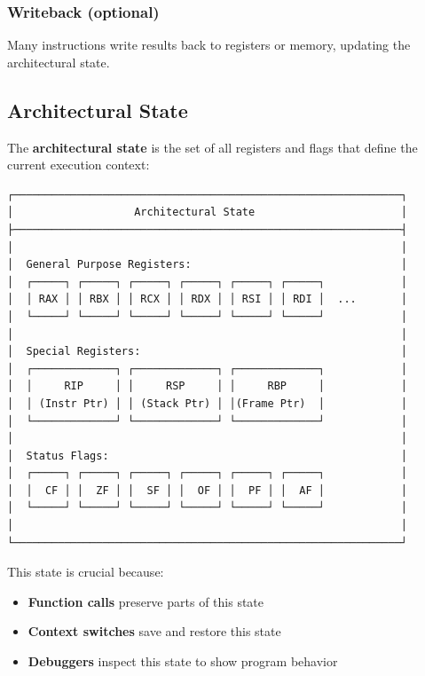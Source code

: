\subsubsection{Writeback (optional)}
Many instructions write results back to registers or memory, updating the architectural state.

\subsection{Architectural State}

The \textbf{architectural state} is the set of all registers and flags that define the current execution context:

\begin{verbatim}
┌─────────────────────────────────────────────────────────────┐
│                   Architectural State                       │
├─────────────────────────────────────────────────────────────┤
│                                                             │
│  General Purpose Registers:                                 │
│  ┌─────┐ ┌─────┐ ┌─────┐ ┌─────┐ ┌─────┐ ┌─────┐            │
│  │ RAX │ │ RBX │ │ RCX │ │ RDX │ │ RSI │ │ RDI │  ...       │
│  └─────┘ └─────┘ └─────┘ └─────┘ └─────┘ └─────┘            │
│                                                             │
│  Special Registers:                                         │
│  ┌─────────────┐ ┌─────────────┐ ┌─────────────┐            │
│  │     RIP     │ │     RSP     │ │     RBP     │            │
│  │ (Instr Ptr) │ │ (Stack Ptr) │ │(Frame Ptr)  │            │
│  └─────────────┘ └─────────────┘ └─────────────┘            │
│                                                             │
│  Status Flags:                                              │
│  ┌─────┐ ┌─────┐ ┌─────┐ ┌─────┐ ┌─────┐ ┌─────┐            │
│  │  CF │ │  ZF │ │  SF │ │  OF │ │  PF │ │  AF │            │
│  └─────┘ └─────┘ └─────┘ └─────┘ └─────┘ └─────┘            │
│                                                             │
└─────────────────────────────────────────────────────────────┘
\end{verbatim}

This state is crucial because:
\begin{itemize}
  \item \textbf{Function calls} preserve parts of this state
  \item \textbf{Context switches} save and restore this state
  \item \textbf{Debuggers} inspect this state to show program behavior
\end{itemize}

